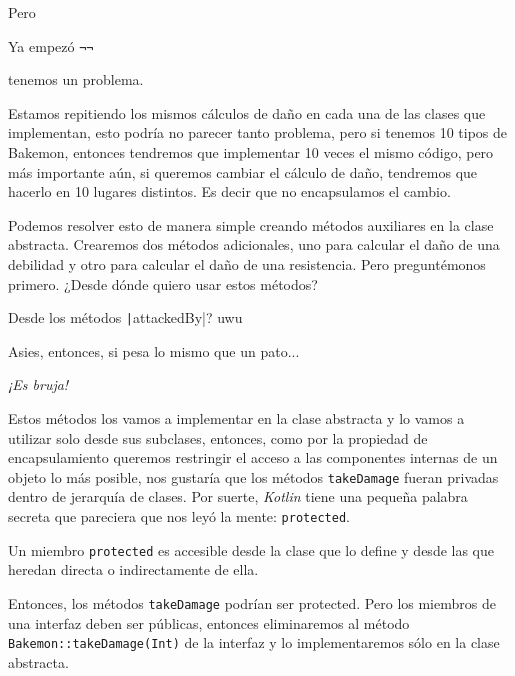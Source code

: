   Pero

  \begin{center}
    Ya empezó \texttt{¬¬}
  \end{center}

  tenemos un problema.

  Estamos repitiendo los mismos cálculos de daño en cada una de las clases que implementan, esto
  podría no parecer tanto problema, pero si tenemos 10 tipos de Bakemon, entonces tendremos que
  implementar 10 veces el mismo código, pero más importante aún, si queremos cambiar el cálculo
  de daño, tendremos que hacerlo en 10 lugares distintos.
  Es decir que no encapsulamos el cambio.

  Podemos resolver esto de manera simple creando métodos auxiliares en la clase abstracta.
  Crearemos dos métodos adicionales, uno para calcular el daño de una debilidad y otro para
  calcular el daño de una resistencia.
  Pero preguntémonos primero.
  ¿Desde dónde quiero usar estos métodos?
  
  \begin{center}
    Desde los métodos \texttt|attackedBy|? uwu
  \end{center}

  Asies, entonces, si pesa lo mismo que un pato...

  \begin{center}
    \textit{¡Es bruja!}
  \end{center}

  Estos métodos los vamos a implementar en la clase abstracta y lo vamos a utilizar solo desde sus 
  subclases, entonces, como por la propiedad de encapsulamiento queremos restringir el acceso a
  las componentes internas de un objeto lo más posible, nos gustaría que los métodos 
  \texttt{takeDamage} fueran privadas dentro de jerarquía de clases.
  Por suerte, \textit{Kotlin} tiene una pequeña palabra secreta que pareciera que nos leyó la mente:
  \texttt{protected}.
  
  \begin{defaultbox}
    Un miembro \texttt{protected} es accesible desde la clase que lo define y desde las
    que heredan directa o indirectamente de ella.    
  \end{defaultbox}
  
  Entonces, los métodos \texttt{takeDamage} podrían ser protected.
  Pero los miembros de una interfaz deben ser públicas, entonces eliminaremos al método 
  \texttt{Bakemon::takeDamage(Int)} de la interfaz y lo implementaremos sólo en la clase
  abstracta.

